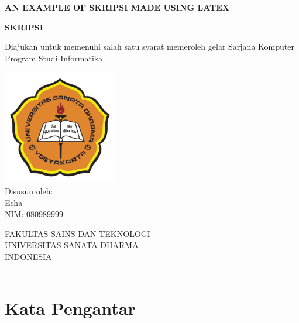 \documentclass[oneside,12pt]{book}
\def\title{An Example of Skripsi Made Using \LaTeX}
\def\author{Echa}
\def\nim{080989999}
\def\prodi{Informatika}
\def\fakultas{Sains dan Teknologi}
\def\sarjana{Komputer}
\begin{document}
\begin{titlepage}
	\begin{center}
		\large
		\textbf{\MakeUppercase{\title}}
		\vspace{2ex}
		
		
		\textbf{SKRIPSI}
		
		\vspace{2ex}
		
		Diajukan untuk memenuhi salah satu syarat memeroleh gelar Sarjana \sarjana \\Program Studi \prodi
		
		
		\vspace{3cm}
		\includegraphics[width=5cm]{usd}\\
		\vspace{1.5cm}
		Disusun oleh:\\
		\author\\
		NIM: \nim\\
		
		\vspace{2cm}
		
		\MakeUppercase{
			Fakultas \fakultas\\
			Universitas Sanata Dharma\\
			Indonesia\\
			\the\year{}\\
		}
	\end{center}
\end{titlepage}

\frontmatter




\chapter{Kata Pengantar}
\end{document}
